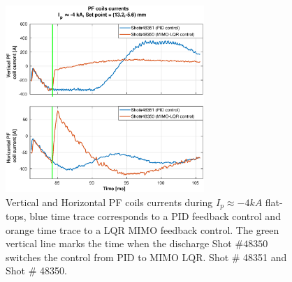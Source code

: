 \begin{figure}
	\centering
	\includegraphics[width=0.67\textwidth]{Chp5/PIDvsMIMO_351_350_curr_2.eps}
	\caption{Vertical and Horizontal PF coils currents during  $I_p\approx -4kA$  flat-tops, blue time trace corresponds to a PID feedback control and orange time trace to a LQR MIMO feedback control. The green vertical line marks the time  when the  discharge Shot $\# 48350$ switches the control from PID to MIMO LQR.  Shot $\#$ 48351 and Shot $\#$ 48350.}
\end{figure}